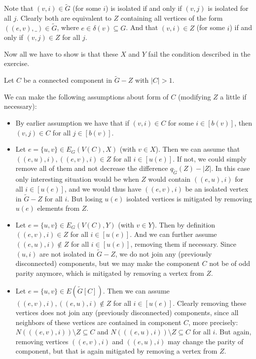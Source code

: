 \begin{exercise}{3}
    Note that $(v, i) \in \tilde{G}$ (for some $i$) is isolated if and only if
    $(v, j)$ is isolated for all $j$. Clearly both are equivalent to $Z$
    containing all vertices of the form $((e, v), \_) \in \tilde{G}$, where $e
    \in \delta(v) \subseteq G$. And that $(v, i) \in Z$ (for some $i$) if and
    only if $(v, j) \in Z$ for all $j$.

    Now all we have to show is that these $X$ and $Y$ fail the condition
    described in the exercise.

    Let $C$ be a connected component in $\tilde{G} - Z$ with $|C| > 1$.
    
    We can make the following assumptions about form of $C$ (modifying $Z$ a
    little if necessary):

    \begin{itemize}
        \item{By earlier assumption we have that if $(v, i) \in C$ for some $i \in
        [b(v)]$, then $(v, j) \in C$ for all $j \in [b(v)]$.}

        \item{Let $e = \{u, v\} \in E_G(V(C), X)$ (with $v \in X$). Then we can
            assume that $((e, u), i), ((e, v), i) \in Z$ for all $i \in [u(e)]$.
            If not, we could simply remove all of them and not decrease the
            difference $q_{\tilde{G}}(Z) - |Z|$. In this case only interesting
            situation would be when $Z$ would contain $((e, u), i)$ for all $i
            \in [u(e)]$, and we would thus have $((e, v), i)$ be an isolated
            vertex in $\tilde{G} - Z$ for all $i$. But losing $u(e)$ isolated
            vertices is mitigated by removing $u(e)$ elements from $Z$.}

        \item{Let $e = \{u, v\} \in E_G(V(C), Y)$ (with $v \in Y$). Then by
            definition $((e, v), i) \in Z$ for all $i \in [u(e)]$. And we can
            further assume $((e, u), i) \notin Z$ for all $i \in [u(e)]$,
            removing them if necessary. Since $(u, i)$ are not isolated in
            $\tilde{G} - Z$, we do not join any (previously disconnected)
            components, but we may make the component $C$ not be of odd parity
            anymore, which is mitigated by removing a vertex from $Z$.}

        \item{Let $e = \{u, v\} \in E(\tilde{G}[C])$. Then we can assume $((e,
            v), i), ((e, u), i) \notin Z$ for all $i \in [u(e)]$. Clearly
            removing these vertices does not join any (previously disconnected)
            components, since all neighbors of these vertices are contained in
            component $C$, more precisely: $N(((e, v), i)) \setminus Z \subseteq
            C$ and $N(((e, u), i)) \setminus Z \subseteq C$ for all $i$. But
            again, removing vertices $((e, v), i)$ and $((e, u), i)$ may change
            the parity of component, but that is again mitigated by removing a
            vertex from $Z$.}
    

\end{itemize}
\end{exercise}
